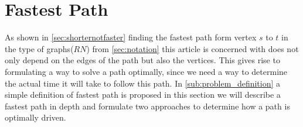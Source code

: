 \section{Fastest Path}
As shown in \cref{sec:shorternotfaster} finding the fastest path form vertex $s$ to $t$ in the type of graphs($RN$) from \cref{sec:notation} this article is concerned with does not only depend on the edges of the path but also the vertices. This gives rise to formulating a way to solve a path optimally, since we need a way to determine the actual time it will take to follow this path. In \cref{sub:problem_definition} a simple definition of fastest path is proposed in this section we will describe a fastest path in depth and formulate two approaches to determine how a path is optimally driven.  
    

